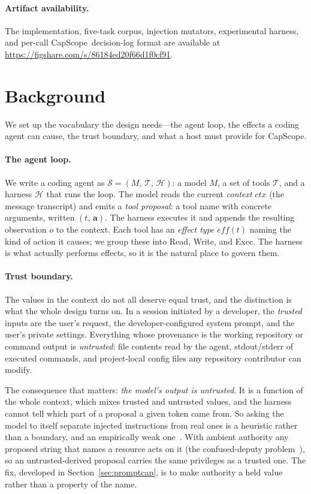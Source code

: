 \documentclass[sigplan,review,anonymous]{acmart}
\newcommand{\tool}{CapScope\xspace}
\begin{document}
  \paragraph{Artifact availability.}
  The implementation, five-task corpus, injection mutators, experimental
  harness, and per-call \tool\ decision-log format are available at
  \url{https://figshare.com/s/86184ed20f66d1f0cf91}.


  \section{Background}
  \label{sec:background}
  We set up the vocabulary the design needs---the agent loop, the effects a
  coding agent can cause, the trust boundary, and what a host must provide for
  \tool.

  \paragraph{The agent loop.}
  We write a coding agent as $\mathcal{S} = (M,\,\mathcal{T},\,\mathcal{H})$:
  a model $M$, a set of tools $\mathcal{T}$, and a harness $\mathcal{H}$ that
  runs the loop. The model reads the current \emph{context} $\mathit{ctx}$
  (the message transcript) and emits a \emph{tool proposal}: a tool name with
  concrete arguments, written $(t,\,\mathbf{a})$. The harness executes it and
  appends the resulting observation $o$ to the context. Each tool has an
  \emph{effect type} $\mathit{eff}(t)$ naming the kind of action it causes;
  we group these into \textsf{Read}, \textsf{Write}, and \textsf{Exec}. The
  harness is what actually performs effects, so it
  is the natural place to govern them.

  \paragraph{Trust boundary.}
  \label{def:integrity}
  The values in the context do not all deserve equal trust, and the
  distinction is what the whole design turns on.
  In a session initiated by a developer, the \emph{trusted} inputs are the
  user's request, the developer-configured system prompt, and the user's
  private settings. Everything whose provenance is the working repository or
  command output is \emph{untrusted}: file contents read by the agent,
  stdout/stderr of executed commands, and project-local config files any
  repository contributor can modify.

  The consequence that matters: \emph{the model's output is untrusted}. It is
  a function of the whole context, which mixes trusted and untrusted values,
  and the harness cannot tell which part of a proposal a given token came
  from. So asking the model to itself separate injected instructions from
  real ones is a heuristic rather than a boundary, and an empirically weak
  one~\cite{liu2025youraishell}. With ambient authority any proposed string
  that names a resource acts on it (the confused-deputy
  problem~\cite{hardy1988confused}), so an untrusted-derived proposal carries
  the same privileges as a trusted one. The fix, developed in
  Section~\ref{sec:promptcap}, is to make authority a held value rather than a
  property of the name.
\end{document}
